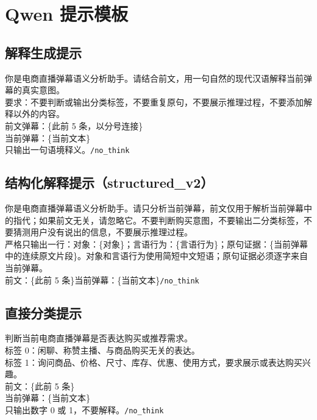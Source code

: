 \documentclass[UTF8,zihao=-4,a4paper]{ctexart}
\begin{document}
\clearpage
\appendix

\section{Qwen 提示模板}

\subsection{解释生成提示}

\begin{tcolorbox}[breakable,colback=gray!3,colframe=gray!45,title=生成提示（标签不进入提示）]
你是电商直播弹幕语义分析助手。请结合前文，用一句自然的现代汉语解释当前弹幕的真实意图。\\
要求：不要判断或输出分类标签，不要重复原句，不要展示推理过程，不要添加解释以外的内容。\\
前文弹幕：\{此前 5 条，以分号连接\}\\
当前弹幕：\{当前文本\}\\
只输出一句语境释义。\texttt{/no\_think}
\end{tcolorbox}

\subsection{结构化解释提示（structured\_v2）}

\begin{tcolorbox}[breakable,colback=gray!3,colframe=gray!45,title=证据约束提示（不输入标签或官方释义）]
你是电商直播弹幕语义分析助手。请只分析当前弹幕，前文仅用于解析当前弹幕中的指代；如果前文无关，请忽略它。不要判断购买意图，不要输出二分类标签，不要猜测用户没有说出的信息，不要展示推理过程。\\
严格只输出一行：对象：\{对象\}；言语行为：\{言语行为\}；原句证据：\{当前弹幕中的连续原文片段\}。对象和言语行为使用简短中文短语；原句证据必须逐字来自当前弹幕。\\
前文：\{此前 5 条\}\quad 当前弹幕：\{当前文本\}\quad\texttt{/no\_think}
\end{tcolorbox}

\subsection{直接分类提示}

\begin{tcolorbox}[breakable,colback=gray!3,colframe=gray!45,title=零样本分类提示]
判断当前电商直播弹幕是否表达购买或推荐需求。\\
标签 0：闲聊、称赞主播、与商品购买无关的表达。\\
标签 1：询问商品、价格、尺寸、库存、优惠、使用方式，要求展示或表达购买兴趣。\\
前文：\{此前 5 条\}\\
当前弹幕：\{当前文本\}\\
只输出数字 0 或 1，不要解释。\texttt{/no\_think}
\end{tcolorbox}
\end{document}

